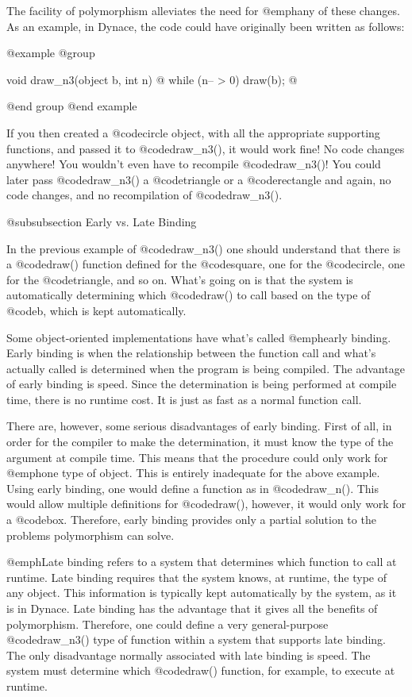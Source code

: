 The facility of polymorphism alleviates the need for @emph{any} of these
changes.  As an example, in Dynace, the code could have originally been
written as follows:

@example
@group

void    draw_n3(object b, int n)
@{
        while (n-- > 0)
                draw(b);
@}

@end group
@end example

If you then created a @code{circle} object, with all the appropriate supporting
functions, and passed it to @code{draw_n3()}, it would work fine!  No code
changes anywhere!  You wouldn't even have to recompile @code{draw_n3()}!
You could later pass @code{draw_n3()} a @code{triangle} or a @code{rectangle}
and again, no code changes, and no recompilation of @code{draw_n3()}.

@subsubsection Early vs. Late Binding

In the previous example of @code{draw_n3()} one should understand that
there is a @code{draw()} function defined for the @code{square}, one for the
@code{circle}, one for the @code{triangle}, and so on.  What's going on is that
the system is automatically determining which @code{draw()} to call based
on the type of @code{b}, which is kept automatically.

Some object-oriented implementations have what's called @emph{early binding}.
Early binding is when the relationship between the function call and
what's actually called is determined when the program is being compiled.
The advantage of early binding is speed.  Since the determination is being
performed at compile time, there is no runtime cost.  It is just as fast
as a normal function call.

There are, however, some serious disadvantages of early binding.  First
of all, in order for the compiler to make the determination, it must know
the type of the argument at compile time.  This means that the procedure
could only work for @emph{one} type of object.  This is entirely
inadequate for the above example.  Using early binding, one would
define a function as in @code{draw_n()}.  This would allow multiple
definitions for @code{draw()}, however, it would only work for a
@code{box}.  Therefore, early binding provides only a partial solution to
the problems polymorphism can solve.

@emph{Late binding} refers to a system that determines which function
to call at runtime.  Late binding requires that the system knows, at
runtime, the type of any object.  This information is typically kept
automatically by the system, as it is in Dynace.  Late binding has the advantage
that it gives all the benefits of polymorphism.  Therefore, one could
define a very general-purpose @code{draw_n3()} type of function within a system
that supports late binding.  The only disadvantage normally associated
with late binding is speed. The system must determine which
@code{draw()} function, for example, to execute at runtime.

